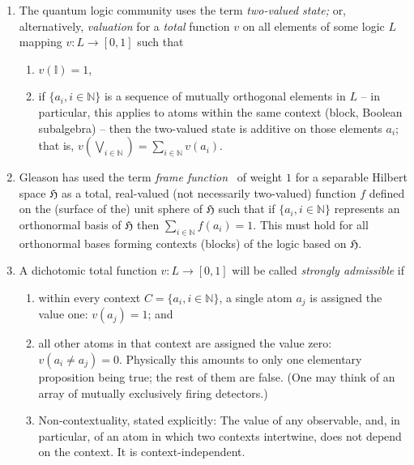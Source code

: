 \documentclass[%
  twocolumn,
 showpacs,
 showkeys,
 preprintnumbers,
 amsmath,amssymb,
 aps,
  pra,
  longbibliography,
 floatfix,
 ]{revtex4-1}
\begin{document}
\begin{enumerate}
\item
The quantum logic community uses the term {\em two-valued state;} or, alternatively, {\em valuation}
for a {\em total} function $v$ on all elements of some logic $L$  mapping
$v: L \rightarrow [0,1]$  such that~\cite[Definition~2.1.1, p.~20]{pulmannova-91}
\begin{enumerate}
\item
$v (\mathbb{I}) = 1$,
\item
if $\{ a_i, i \in \mathbb{N}\}$ is a sequence of mutually orthogonal elements in $L$ -- in particular,  this applies to
atoms within the same context (block, Boolean subalgebra) --
then the two-valued state is additive on those elements $a_i$; that is,
$v\left( \bigvee_{i \in \mathbb{N}} \right) = \sum_{i \in \mathbb{N}} v(a_i)$.
\end{enumerate}

\item
Gleason has used the term {\em frame function}~\cite[p.~886]{Gleason}
of weight $1$ for a separable Hilbert space $\mathfrak{H}$ as a
total,
real-valued (not necessarily two-valued) function $f$ defined on the (surface of the)
unit sphere of $\mathfrak{H}$  such that if
$\{ a_i, i \in \mathbb{N}\}$ represents an orthonormal basis  of  $\mathfrak{H}$ then
$ \sum_{i \in \mathbb{N}} f(a_i) = 1$.    This must hold for all orthonormal bases
forming contexts (blocks) of the logic based on  $\mathfrak{H}$.


\item
A dichotomic total function $v: L \rightarrow [0,1]$  will be called   {\em strongly admissible}
if
\begin{enumerate}
\item  within every context $C = \{ a_i, i \in \mathbb{N}\}$, a single atom $a_j$ is assigned the value one: $v(a_j)=1$;
and
\item   all other atoms in that context are assigned the value zero: $v(a_i\neq a_j )=0$.
Physically this amounts to only one elementary proposition being true; the rest of them are false.
(One may think of an array of mutually exclusively firing detectors.)
\item    Non-contextuality, stated explicitly:
The value of any observable, and, in particular, of an atom in which two contexts intertwine, does not depend on the context. It is context-independent.
\end{enumerate}


\end{enumerate}
\end{document}
